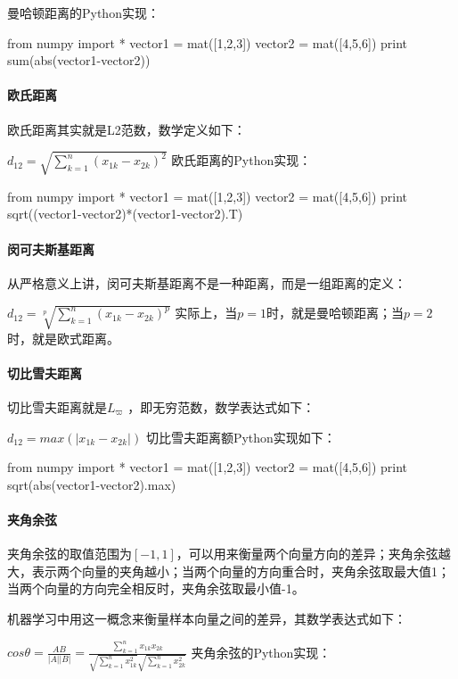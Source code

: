 \documentclass[11pt]{book}
\newcounter{#2}
\newcounter{#2}[#1]
\numberwithin{#2}{#1}
\begin{document}
曼哈顿距离的Python实现：

from numpy import *
vector1 = mat([1,2,3])
vector2 = mat([4,5,6])
print sum(abs(vector1-vector2))
\paragraph{欧氏距离}

欧氏距离其实就是L2范数，数学定义如下： 

$ d_{12} =\sqrt{\sum_{k=1}^{n}{\left( x_{1k} -x_{2k}  \right) ^{2} } }  $
欧氏距离的Python实现：

from numpy import *
vector1 = mat([1,2,3])
vector2 = mat([4,5,6])
print sqrt((vector1-vector2)*(vector1-vector2).T)
\paragraph{闵可夫斯基距离}

从严格意义上讲，闵可夫斯基距离不是一种距离，而是一组距离的定义：

$ d_{12} =\sqrt[p]{\sum_{k=1}^{n}{\left( x_{1k} -x_{2k}  \right) ^{p} } }  $
实际上，当$ p=1 $时，就是曼哈顿距离；当$ p=2 $时，就是欧式距离。

\paragraph{切比雪夫距离}

切比雪夫距离就是$ L_{\varpi} $ ，即无穷范数，数学表达式如下：

$ d_{12} =max\left( \left| x_{1k}-x_{2k} \right|  \right)  $
切比雪夫距离额Python实现如下：

from numpy import *
vector1 = mat([1,2,3])
vector2 = mat([4,5,6])
print sqrt(abs(vector1-vector2).max)
\paragraph{夹角余弦}

夹角余弦的取值范围为$ [-1,1] $，可以用来衡量两个向量方向的差异；夹角余弦越大，表示两个向量的夹角越小；当两个向量的方向重合时，夹角余弦取最大值1；当两个向量的方向完全相反时，夹角余弦取最小值-1。

机器学习中用这一概念来衡量样本向量之间的差异，其数学表达式如下：

$ cos\theta =\frac{AB}{\left| A \right| \left|B \right| } =\frac{\sum_{k=1}^{n}{x_{1k}x_{2k} } }{\sqrt{\sum_{k=1}^{n}{x_{1k}^{2} } } \sqrt{\sum_{k=1}^{n}{x_{2k}^{2} } } }  $
夹角余弦的Python实现：
\end{document}
